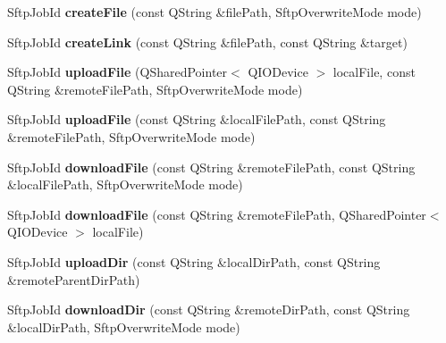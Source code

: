 \begin{DoxyCompactItemize}
\item 
\mbox{\label{class_q_ssh_1_1_sftp_channel_ad5f944a5e998f7750b0d93239e825652}} 
Sftp\+Job\+Id {\bfseries create\+File} (const Q\+String \&file\+Path, Sftp\+Overwrite\+Mode mode)
\item 
\mbox{\label{class_q_ssh_1_1_sftp_channel_ab8974032685bde82598c9a1a8ee66997}} 
Sftp\+Job\+Id {\bfseries create\+Link} (const Q\+String \&file\+Path, const Q\+String \&target)
\item 
\mbox{\label{class_q_ssh_1_1_sftp_channel_adf9df55e6fcc94e0f2d6ccacc09269ad}} 
Sftp\+Job\+Id {\bfseries upload\+File} (Q\+Shared\+Pointer$<$ Q\+I\+O\+Device $>$ local\+File, const Q\+String \&remote\+File\+Path, Sftp\+Overwrite\+Mode mode)
\item 
\mbox{\label{class_q_ssh_1_1_sftp_channel_aef5f43cc670c2e471435cc41e4b42fef}} 
Sftp\+Job\+Id {\bfseries upload\+File} (const Q\+String \&local\+File\+Path, const Q\+String \&remote\+File\+Path, Sftp\+Overwrite\+Mode mode)
\item 
\mbox{\label{class_q_ssh_1_1_sftp_channel_ad3a860d3c748417bd78a594731983c9d}} 
Sftp\+Job\+Id {\bfseries download\+File} (const Q\+String \&remote\+File\+Path, const Q\+String \&local\+File\+Path, Sftp\+Overwrite\+Mode mode)
\item 
\mbox{\label{class_q_ssh_1_1_sftp_channel_ae27f88d97c7eebc6fc9b587f3114062e}} 
Sftp\+Job\+Id {\bfseries download\+File} (const Q\+String \&remote\+File\+Path, Q\+Shared\+Pointer$<$ Q\+I\+O\+Device $>$ local\+File)
\item 
\mbox{\label{class_q_ssh_1_1_sftp_channel_a70ce68bad21720c53272c22fded868b2}} 
Sftp\+Job\+Id {\bfseries upload\+Dir} (const Q\+String \&local\+Dir\+Path, const Q\+String \&remote\+Parent\+Dir\+Path)
\item 
\mbox{\label{class_q_ssh_1_1_sftp_channel_a41c22485de6cd3a4c764e64b31a13500}} 
Sftp\+Job\+Id {\bfseries download\+Dir} (const Q\+String \&remote\+Dir\+Path, const Q\+String \&local\+Dir\+Path, Sftp\+Overwrite\+Mode mode)
\end{DoxyCompactItemize}
